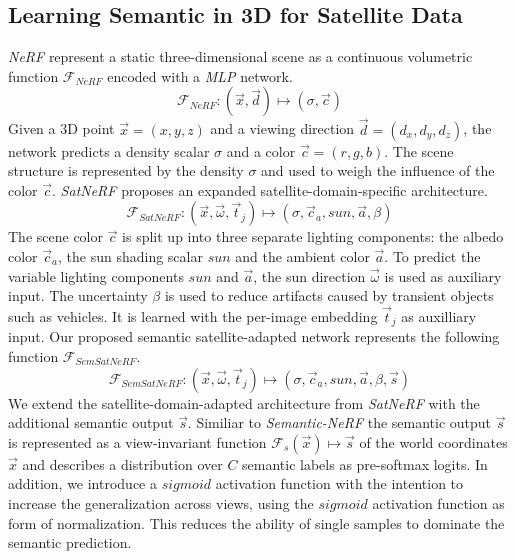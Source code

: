 \subsection{Learning Semantic in 3D for Satellite Data}
\emph{NeRF} \cite{nerf} represent a static three-dimensional scene as a continuous volumetric function $\mathcal{F}_{NeRF}$ encoded with a \emph{MLP} network. 
\begin{equation}
	\mathcal{F}_{NeRF}: (\vec{x}, \vec{d}) \mapsto (\sigma, \vec{c})
\end{equation}
Given a 3D point $\vec{x} = (x, y, z)$ and a viewing direction $\vec{d} = (d_x, d_y, d_z)$, the network predicts a density scalar $\sigma$ and a color $\vec{c}=(r, g, b)$.
The scene structure is represented by the density $\sigma$ and used to weigh the influence of the color $\vec{c}$.
\emph{SatNeRF} \cite{satnerf} proposes an expanded satellite-domain-specific architecture. %
\begin{equation}
	\mathcal{F}_{SatNeRF}: (\vec{x}, \vec{\omega}, \vec{t}_j) \mapsto (\sigma, \vec{c}_a, \mathit{sun}, \vec{a}, \beta)
\end{equation}
The scene color $\vec{c}$ is split up into three separate lighting components: the albedo color $\vec{c}_a$, the sun shading scalar $\mathit{sun}$ and the ambient color $\vec{a}$. To predict the variable lighting components $\mathit{sun}$ and $\vec{a}$, the sun direction $\vec{\omega}$ is used as auxiliary input.
The uncertainty $\beta$ is used to reduce artifacts caused by transient objects such as vehicles. It is learned with the per-image embedding $\vec{t}_j$ as auxilliary input. 
Our proposed semantic satellite-adapted network represents the following function $\mathcal{F}_{SemSatNeRF}$.
\begin{equation}
		\mathcal{F}_{SemSatNeRF}: (\vec{x}, \vec{\omega}, \vec{t}_j) \mapsto (\sigma, \vec{c}_a, \mathit{sun}, \vec{a}, \beta, \vec{s})
\end{equation} 
We extend the satellite-domain-adapted architecture from \emph{SatNeRF} \cite{satnerf} with the additional semantic output $\vec{s}$.
Similiar to \emph{Semantic-NeRF} \cite{semanticnerf} the semantic output $\vec{s}$
is represented as a view-invariant function $\mathcal{F}_s(\vec{x}) \mapsto \vec{s}$ of the world coordinates $\vec{x}$ and describes a distribution over $C$ semantic labels as pre-softmax logits.
In addition, we introduce a $\mathit{sigmoid}$ activation function with the intention to increase the generalization across views, using the 
$\mathit{sigmoid}$ activation function as form of normalization. This reduces the ability of single samples to dominate the semantic prediction. 
